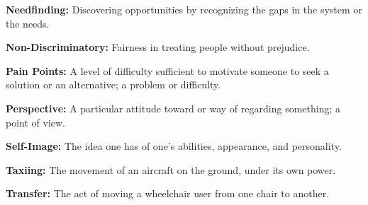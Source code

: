   \item \textbf{Needfinding:} Discovering opportunities by recognizing the gaps in the system or the needs.

  \item \textbf{Non-Discriminatory:} Fairness in treating people without prejudice.

  \item \textbf{Pain Points:} A level of difficulty sufficient to motivate someone to seek a solution or an alternative; a problem or difficulty.

  \item \textbf{Perspective:} A particular attitude toward or way of regarding something; a point of view.

  \item \textbf{Self-Image:} The idea one has of one's abilities, appearance, and personality.


 \item \textbf{Taxiing:} The movement of an aircraft on the ground, under its own power.

  \item \textbf{Transfer:} The act of moving a wheelchair user from one chair to another. 

